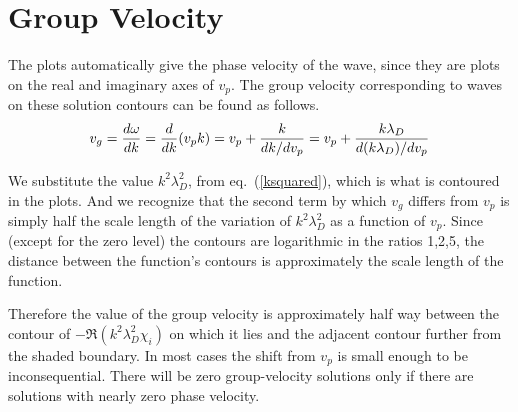 \documentclass[12pt]{article}
\begin{document}
\section{Group Velocity}

The plots automatically give the phase velocity of the wave, since
they are plots on the real and imaginary axes of $v_p$. The group
velocity corresponding to waves on these solution contours can be
found as follows.
\begin{equation}
  \label{vgroup}
  v_g = {d\omega\over dk} = {d\over dk}(v_p k) = v_p + {k\over
    dk/dv_p} = v_p + {k\lambda_{D}\over d(k\lambda_{D})/dv_p}
\end{equation}

We substitute the value $k^2\lambda_{D}^2$, from eq.\
(\ref{ksquared}), which is what is contoured in the plots. And we
recognize that the second term by which $v_g$ differs from $v_p$ is
simply half the scale length of the variation of $k^2\lambda_{D}^2$ as
a function of $v_p$. Since (except for the zero level) the contours
are logarithmic in the ratios 1,2,5, the distance between the
function's contours is approximately the scale length of the function.


Therefore the value of the group velocity is approximately half way
between the contour of $-\Re (k^2\lambda_{D}^2 \chi_i)$ on which
it lies and the adjacent contour further from the shaded boundary. In
most cases the shift from $v_p$ is small enough to be inconsequential.
There will be zero group-velocity solutions only if there are
solutions with nearly zero phase velocity.
\end{document}
